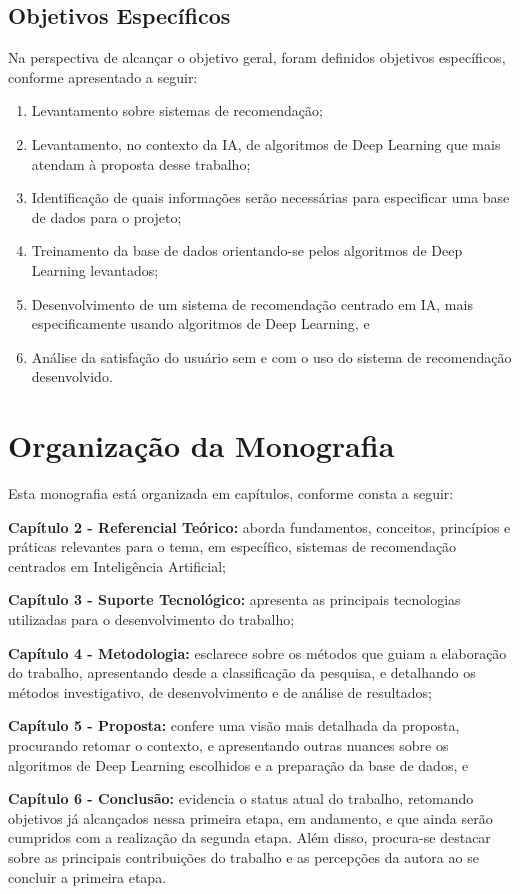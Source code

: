 \subsection{Objetivos Específicos}
Na perspectiva de alcançar o objetivo geral, foram definidos objetivos específicos, conforme apresentado a seguir:

\begin{enumerate}
    \item Levantamento sobre sistemas de recomendação;
    \item Levantamento, no contexto da IA, de algoritmos de Deep Learning que mais atendam à proposta desse trabalho;
    \item Identificação de quais informações serão necessárias para especificar uma base de dados para o projeto;
    \item Treinamento da base de dados orientando-se pelos algoritmos de Deep Learning levantados;
    \item Desenvolvimento de um sistema de recomendação centrado em IA, mais especificamente usando algoritmos de Deep Learning, e
    \item Análise da satisfação do usuário sem e com o uso do sistema de recomendação desenvolvido.
\end{enumerate}

\section{Organização da Monografia}\label{sec:organizacao}

Esta monografia está organizada em capítulos, conforme consta a seguir:

\textbf{Capítulo 2 - Referencial Teórico:} aborda fundamentos, conceitos, princípios e práticas
relevantes para o tema, em específico, sistemas de recomendação centrados em Inteligência Artificial;

\textbf{Capítulo 3 - Suporte Tecnológico:} apresenta as principais tecnologias utilizadas para
o desenvolvimento do trabalho;

\textbf{Capítulo 4 - Metodologia:} esclarece sobre os métodos que guiam a elaboração do trabalho, apresentando desde a classificação da 
pesquisa, e detalhando os métodos investigativo, de desenvolvimento e de análise de resultados;

\textbf{Capítulo 5 - Proposta:} confere uma visão mais detalhada da proposta, procurando retomar o contexto, e apresentando outras 
nuances sobre os algoritmos de Deep Learning escolhidos e a preparação da base de dados, e

\textbf{Capítulo 6 - Conclusão:} evidencia o status atual do trabalho, retomando objetivos já alcançados nessa primeira 
etapa, em andamento, e que ainda serão cumpridos com a realização da segunda etapa. Além disso, procura-se destacar 
sobre as principais contribuições do trabalho e as percepções da autora ao se concluir a primeira etapa. 
